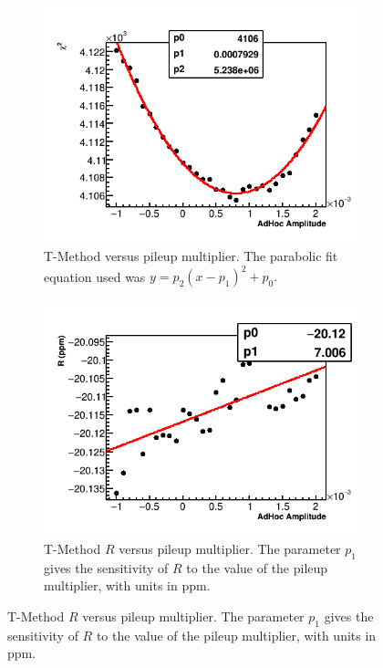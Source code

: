 \begin{figure}[h]
\centering
    \begin{subfigure}[t]{0.45\textwidth}
        \centering
        \includegraphics[width=\textwidth]{TMethod_Chi2_Vs_AdHocAmplitude_Canv}
        \caption{T-Method \chisq versus pileup multiplier. The parabolic fit equation used was $y = p_{2}(x - p_{1})^{2} + p_{0}.$}
    \end{subfigure}%
    \hspace{1cm}
    \begin{subfigure}[t]{0.45\textwidth}
        \centering
        \includegraphics[width=\textwidth]{TMethod_R_Vs_AdHocAmplitude_Canv}
        \caption{T-Method $R$ versus pileup multiplier. The parameter $p_{1}$ gives the sensitivity of $R$ to the value of the pileup multiplier, with units in ppm.}
    \end{subfigure}


\end{figure}
